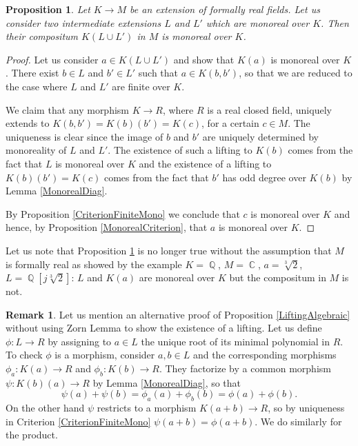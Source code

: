 \documentclass[12pt]{amsart}
\newtheorem{prop}[thm]{Proposition}
\theoremstyle{definition}
\newtheorem{rem}[thm]{Remark}
\DeclareMathOperator{\QQ}{\mathbb Q}
\DeclareMathOperator{\CC}{\mathbb C}
\begin{document}
		
\begin{prop}\label{MonorealCompositum}
	Let $K\to M$ be an extension of formally real fields. Let us consider two intermediate extensions $L$ and $L'$ which are monoreal over $K$.
	Then their compositum $K(L\cup L')$ in $M$ is monoreal over $K$.
\end{prop}	
\begin{proof}
Let us consider $a\in K(L\cup L')$ and show that $K(a)$ is monoreal over $K$. There exist $b\in L$
and $b'\in L'$ such that $a\in K(b,b')$, so that we are reduced to the case where $L$ and $L'$ are finite over $K$.
	
We claim that any morphism $K\to R$, where $R$  is a real closed field, uniquely extends to $K(b,b')=K(b)(b')=K(c)$, for a certain $c\in M$.
The uniqueness is clear since the image of $b$ and $b'$ are uniquely determined by monoreality of $L$ and $L'$. 
The existence of such a lifting to $K(b)$ comes from the fact that $L$ is monoreal over $K$ and the existence of a lifting to $K(b)(b')=K(c)$ comes from the fact that 
$b'$ has odd degree over $K(b)$ by Lemma \ref{MonorealDiag}.

By Proposition \ref{CriterionFiniteMono} we conclude that $c$ is monoreal over $K$ and hence, by Proposition \ref{MonorealCriterion}, that $a$ is monoreal over $K$.
\end{proof}




Let us note that Proposition \ref{MonorealCompositum} is no longer true without the assumption that $M$ is formally real as showed by the example $K=\QQ$, $M=\CC$, $a=\sqrt[3]{2}$,  $L=\QQ[j\sqrt[3]{2}]$: $L$ and $K(a)$ are monoreal over $K$ but the compositum in $M$ is not.


\begin{rem}
	Let us mention an alternative proof of Proposition \ref{LiftingAlgebraic} without using Zorn Lemma to show the existence of a lifting. 
	Let us define $\phi:L\to R$ by assigning to $a\in L$ the unique root of its minimal polynomial in $R$. To check $\phi$ is a morphism, consider $a,b\in L$ and the corresponding morphisms $\phi_a:K(a)\to R$ and $\phi_b:K(b)\to R$. They factorize by a common morphism $\psi:K(b)(a)\to R$ by Lemma \ref{MonorealDiag}, so that 
	$$\psi(a)+\psi(b)=\phi_a(a) + \phi_b(b)=\phi(a) + \phi(b).$$
	On the other hand $\psi$ restricts to a morphism $K(a+b)\to R$, so by uniqueness in Criterion \ref{CriterionFiniteMono} $\psi(a+b)=\phi(a+b)$. We do similarly for the product.
\end{rem}
\end{document}

